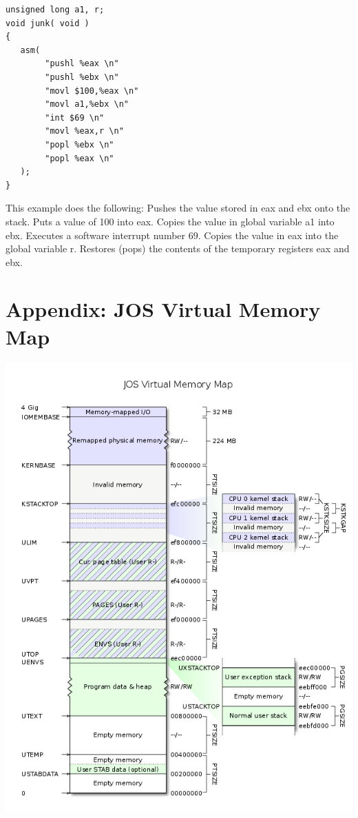\documentclass{note}
\begin{document}
{\begin{verbatim}
unsigned long a1, r;
void junk( void )
{
   asm(
        "pushl %eax \n"
        "pushl %ebx \n"
        "movl $100,%eax \n"
        "movl a1,%ebx \n"
        "int $69 \n"
        "movl %eax,r \n"
        "popl %ebx \n"
        "popl %eax \n"
   );
}
\end{verbatim}
This example does the following:
\ben
\w Pushes the value stored in eax and ebx onto the stack.
\w  Puts a value of 100 into eax.
\w  Copies the value in global variable a1 into ebx.
\w  Executes a software interrupt number 69.
\w  Copies the value in eax into the global variable r.
\w  Restores (pops) the contents of the temporary registers eax and ebx.
\een

\pagebreak
\section{Appendix: JOS Virtual Memory Map}
\centerline{\includegraphics[width=15cm]{pics/jos_layout}}

}
\end{document}
